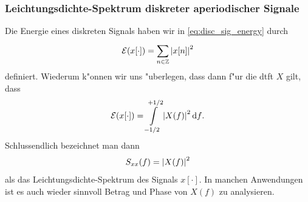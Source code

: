 \subsubsection{Leichtungsdichte-Spektrum diskreter aperiodischer Signale}\label{sec:fourier:disc_aperiod_power}
%
Die Energie eines diskreten Signals haben wir in \eqref{eq:disc_sig_energy} durch
\[
\mathcal{E}(x[\cdot]) = {\sum\limits_{n \in \mathbb{Z}}^{}{{\left| x[n] \right|}^2}} 
\]
definiert.
Wiederum k"onnen wir uns "uberlegen, dass dann f"ur die \gls{dtft} $X$ gilt, dass
\[
\mathcal{E}(x[\cdot]) = {\int\limits_{-1/2}^{+1/2}{{\left| X(f) \right|}^2}\,\mathrm{d}{f}}.
\]
Schlussendlich bezeichnet man dann
\[
S_{xx}(f) = {\left| X(f) \right|}^2
\]
als das Leichtungsdichte-Spektrum des Signals $x[\cdot]$.
In manchen Anwendungen ist es auch wieder sinnvoll Betrag und Phase von $X(f)$ zu analysieren.
%

